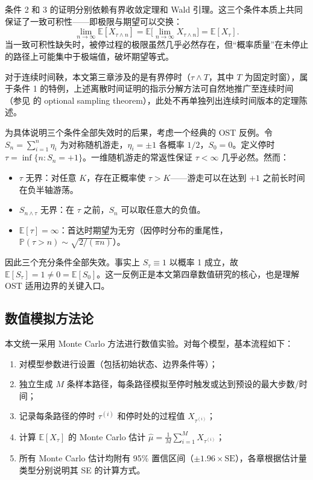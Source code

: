 条件 2 和 3 的证明分别依赖有界收敛定理和 Wald 引理。这三个条件本质上共同保证了一致可积性——即极限与期望可以交换：
\begin{equation}
  \lim_{n \to \infty} \mathbb{E}[X_{\tau \wedge n}] = \mathbb{E}\Big[\lim_{n \to \infty} X_{\tau \wedge n}\Big] = \mathbb{E}[X_\tau].
\end{equation}
当一致可积性缺失时，被停过程的极限虽然几乎必然存在，但``概率质量''在未停止的路径上可能集中于极端值，破坏期望等式。

对于连续时间鞅，本文第三章涉及的是有界停时（$\tau \wedge T$，其中 $T$ 为固定时窗），属于条件 1 的特例，上述离散时间证明的指示分解方法可自然地推广至连续时间（参见 \cite{doob1953stochastic} 的 optional sampling theorem），此处不再单独列出连续时间版本的定理陈述。

为具体说明三个条件全部失效时的后果，考虑一个经典的 OST 反例。令 $S_n = \sum_{i=1}^{n} \eta_i$ 为对称随机游走，$\eta_i = \pm 1$ 各概率 $1/2$，$S_0 = 0$。定义停时 $\tau = \inf\{n: S_n = +1\}$。一维随机游走的常返性保证 $\tau < \infty$ 几乎必然。然而：
\begin{itemize}[noitemsep]
  \item $\tau$ 无界：对任意 $K$，存在正概率使 $\tau > K$——游走可以在达到 $+1$ 之前长时间在负半轴游荡。
  \item $S_{n \wedge \tau}$ 无界：在 $\tau$ 之前，$S_n$ 可以取任意大的负值。
  \item $\mathbb{E}[\tau] = \infty$：首达时期望为无穷（因停时分布的重尾性，$\mathbb{P}(\tau > n) \sim \sqrt{2/(\pi n)}$）\cite{feller1968introduction}。
\end{itemize}
因此三个充分条件全部失效。事实上 $S_\tau \equiv 1$ 以概率 1 成立，故 $\mathbb{E}[S_\tau] = 1 \neq 0 = \mathbb{E}[S_0]$。这一反例正是本文第四章数值研究的核心，也是理解 OST 适用边界的关键入口。

\subsection{数值模拟方法论}

本文统一采用 Monte Carlo 方法进行数值实验。对每个模型，基本流程如下：
\begin{enumerate}[noitemsep]
  \item 对模型参数进行设置（包括初始状态、边界条件等）；
  \item 独立生成 $M$ 条样本路径，每条路径模拟至停时触发或达到预设的最大步数/时间；
  \item 记录每条路径的停时 $\tau^{(i)}$ 和停时处的过程值 $X_{\tau^{(i)}}$；
  \item 计算 $\mathbb{E}[X_\tau]$ 的 Monte Carlo 估计 $\hat{\mu} = \frac{1}{M} \sum_{i=1}^{M} X_{\tau^{(i)}}$；
  \item 所有 Monte Carlo 估计均附有 95\% 置信区间（$\pm 1.96 \times \mathrm{SE}$），各章根据估计量类型分别说明其 SE 的计算方式。
\end{enumerate}

